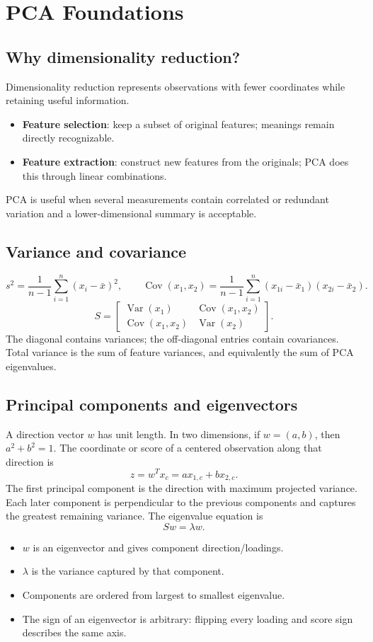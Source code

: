 \documentclass[11pt]{article}
\begin{document}
\section{PCA Foundations}
\subsection{Why dimensionality reduction?}
Dimensionality reduction represents observations with fewer coordinates while retaining useful information.
\begin{itemize}
	\item \textbf{Feature selection}: keep a subset of original features; meanings remain directly recognizable.
	\item \textbf{Feature extraction}: construct new features from the originals; PCA does this through linear combinations.
\end{itemize}
PCA is useful when several measurements contain correlated or redundant variation and a lower-dimensional summary is acceptable.

\subsection{Variance and covariance}
\[
s^2=\frac{1}{n-1}\sum_{i=1}^{n}(x_i-\bar{x})^2,
\qquad
\operatorname{Cov}(x_1,x_2)=\frac{1}{n-1}\sum_{i=1}^{n}(x_{1i}-\bar{x}_1)(x_{2i}-\bar{x}_2).
\]
\[
S=\begin{bmatrix}
\operatorname{Var}(x_1)&\operatorname{Cov}(x_1,x_2)\\
\operatorname{Cov}(x_1,x_2)&\operatorname{Var}(x_2)
\end{bmatrix}.
\]
The diagonal contains variances; the off-diagonal entries contain covariances. Total variance is the sum of feature variances, and equivalently the sum of PCA eigenvalues.

\subsection{Principal components and eigenvectors}
A direction vector $w$ has unit length. In two dimensions, if $w=(a,b)$, then $a^2+b^2=1$. The coordinate or score of a centered observation along that direction is
\[
z=w^Tx_c=ax_{1,c}+bx_{2,c}.
\]
The first principal component is the direction with maximum projected variance. Each later component is perpendicular to the previous components and captures the greatest remaining variance. The eigenvalue equation is
\[
Sw=\lambda w.
\]
\begin{itemize}
	\item $w$ is an eigenvector and gives component direction/loadings.
	\item $\lambda$ is the variance captured by that component.
	\item Components are ordered from largest to smallest eigenvalue.
	\item The sign of an eigenvector is arbitrary: flipping every loading and score sign describes the same axis.
\end{itemize}
\end{document}
